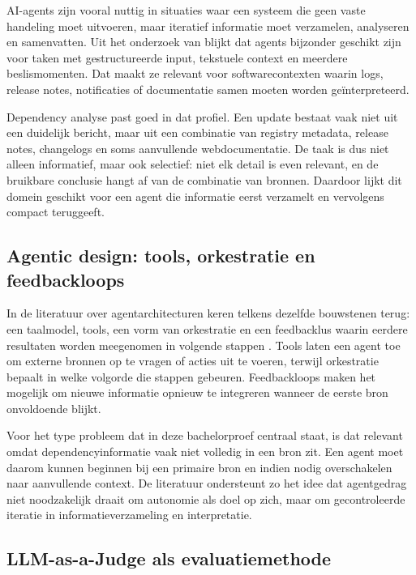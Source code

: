 AI-agents zijn vooral nuttig in situaties waar een systeem die geen vaste handeling moet uitvoeren, maar iteratief informatie moet verzamelen, analyseren en samenvatten. Uit het onderzoek van \textcite{Joshi2025,Zhu2025} blijkt dat agents bijzonder geschikt zijn voor taken met gestructureerde input, tekstuele context en meerdere beslismomenten. Dat maakt ze relevant voor softwarecontexten waarin logs, release notes, notificaties of documentatie samen moeten worden geïnterpreteerd.

Dependency analyse past goed in dat profiel. Een update bestaat vaak niet uit een duidelijk bericht, maar uit een combinatie van registry metadata, release notes, changelogs en soms aanvullende webdocumentatie. De taak is dus niet alleen informatief, maar ook selectief: niet elk detail is even relevant, en de bruikbare conclusie hangt af van de combinatie van bronnen. Daardoor lijkt dit domein geschikt voor een agent die informatie eerst verzamelt en vervolgens compact teruggeeft.

\subsection{Agentic design: tools, orkestratie en feedbackloops}

In de literatuur over agentarchitecturen keren telkens dezelfde bouwstenen terug: een taalmodel, tools, een vorm van orkestratie en een feedbacklus waarin eerdere resultaten worden meegenomen in volgende stappen \textcite{Kim2024,Zhu2025}. Tools laten een agent toe om externe bronnen op te vragen of acties uit te voeren, terwijl orkestratie bepaalt in welke volgorde die stappen gebeuren. Feedbackloops maken het mogelijk om nieuwe informatie opnieuw te integreren wanneer de eerste bron onvoldoende blijkt.

Voor het type probleem dat in deze bachelorproef centraal staat, is dat relevant omdat dependencyinformatie vaak niet volledig in een bron zit. Een agent moet daarom kunnen beginnen bij een primaire bron en indien nodig overschakelen naar aanvullende context. De literatuur ondersteunt zo het idee dat agentgedrag niet noodzakelijk draait om autonomie als doel op zich, maar om gecontroleerde iteratie in informatieverzameling en interpretatie.

\subsection{LLM-as-a-Judge als evaluatiemethode}
\label{subsec:llm-as-a-judge}

